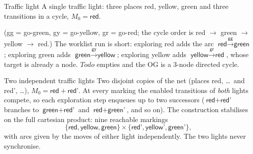 \begin{examplebox}{Traffic light}
A single traffic light: three places \textsf{red}, \textsf{yellow}, \textsf{green} and three transitions in a cycle, $M_0 = \textsf{red}$.
\begin{center}
\end{center}
(\textsf{gg} = go-green, \textsf{gy} = go-yellow, \textsf{gr} = go-red; the cycle order is red $\to$ green $\to$ yellow $\to$ red.) The worklist run is short: exploring \textsf{red} adds the arc $\textsf{red} \xrightarrow{\textsf{gg}} \textsf{green}$; exploring \textsf{green} adds $\textsf{green} \xrightarrow{\textsf{gy}} \textsf{yellow}$; exploring \textsf{yellow} adds $\textsf{yellow} \xrightarrow{\textsf{gr}} \textsf{red}$, whose target is already a node. $\textit{Todo}$ empties and the OG is a 3-node directed cycle.
\end{examplebox}

\begin{examplebox}{Two independent traffic lights}
Two disjoint copies of the net (places \textsf{red}, \dots\ and \textsf{red'}, \dots), $M_0 = \textsf{red} + \textsf{red'}$. At every marking the enabled transitions of \emph{both} lights compete, so each exploration step enqueues up to two successors ($\textsf{red} + \textsf{red'}$ branches to $\textsf{green} + \textsf{red'}$ and $\textsf{red} + \textsf{green'}$, and so on). The construction stabilises on the full cartesian product: nine reachable markings
\[
  \{\textsf{red}, \textsf{yellow}, \textsf{green}\} \times \{\textsf{red'}, \textsf{yellow'}, \textsf{green'}\},
\]
with arcs given by the moves of either light independently. The two lights never synchronise.
\end{examplebox}

